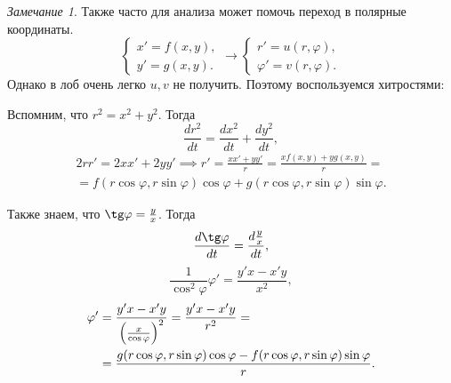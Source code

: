 \documentclass[a5paper, 11pt]{article}
\theoremstyle{definition}
\theoremstyle{plain}
\theoremstyle{remark}
\newtheorem*{Note}{Замечание}
\begin{document}
	\begin{Note}
		Также часто для анализа может помочь переход в полярные координаты.
		\[
		\begin{cases}
			x'=f(x,y),\\
			y'=g(x,y).
		\end{cases}
		\longrightarrow \begin{cases}
			r' = u(r,\varphi),\\
			\varphi' = v(r,\varphi).
		\end{cases}
		\]
		Однако в лоб очень легко $u,v$ не получить. Поэтому воспользуемся хитростями:
		
		Вспомним, что $r^2 = x^2+y^2$. Тогда
		\[
		\frac{d r^2}{dt} = \frac{d x^2}{dt} + \frac{d y^2}{dt},
		\]
		\[
		\begin{split}
		2rr' = 2xx' + 2yy' \implies r' = \frac{xx'+yy'}{r} = \frac{xf(x,y)+yg(x,y)}{r} = \\
		= f(r\cos \varphi, r\sin \varphi) \cos\varphi + g(r\cos \varphi, r\sin \varphi) \sin \varphi.
		\end{split}
		\]
		
		Также знаем, что $\tg \varphi = \frac yx$. Тогда
		\[
		\frac{d \tg \varphi}{dt} = \frac{d \frac yx}{dt},
		\]
		\[
		\frac{1}{\cos^2 \varphi} \varphi' = \frac{y'x-x'y}{x^2},
		\]
		\[
		\begin{split}
		\varphi' &= \frac{y'x-x'y}{\left(\frac{x}{\cos \varphi}\right)^2} = \frac{y'x-x'y}{r^2} =\\
		&= \frac{g(r\cos \varphi, r\sin \varphi)\cos \varphi -f(r\cos \varphi, r\sin \varphi)\sin \varphi}{r}.
		\end{split}
		\]
	\end{Note}
\end{document}
